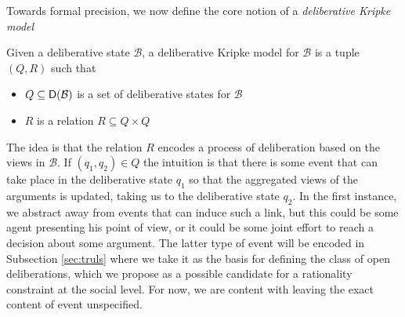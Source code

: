 \documentclass[greybox]{svmult}
\newcommand{\dstate}[1]{\sf D({#1}) }
\newcommand{\views}{\mathcal B}
\begin{document}
Towards formal precision, we now define the core notion of a \emph{deliberative Kripke model}

\begin{definition}\label{def:dk}
Given a deliberative state $\views$, a deliberative Kripke model for $\views$ is a tuple $(Q,R)$ such that
\begin{itemize}
\item $Q \subseteq \dstate \views$ is a set of deliberative states for $\views$
\item $R$ is a relation $R \subseteq Q \times Q$
\end{itemize}
\end{definition}

The idea is that the relation $R$ encodes a process of deliberation based on the views in $\views$. If $(q_1,q_2) \in Q$ the intuition is that there is some event that can take place in the deliberative state $q_1$ so that the aggregated views of the arguments is updated, taking us to the deliberative state $q_2$. In the first instance, we abstract away from events that can induce such a link, but this could be some agent presenting his point of view, or it could be some joint effort to reach a decision about some argument. The latter type of event will be encoded in Subsection \ref{sec:truls} where we take it as the basis for defining the class of open deliberations, which we propose as a possible candidate for a rationality constraint at the social level. For now, we are content with leaving the exact content of event unspecified. 
\end{document}

